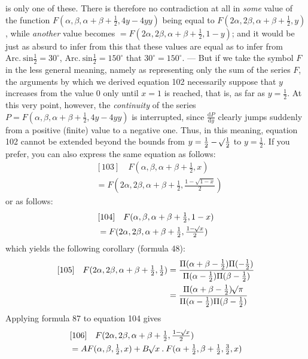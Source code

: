 is only one of these. There is therefore no contradiction at all in \textit{some} value of the function $F(\alpha,\beta,\alpha+\beta+\frac12,4y-4yy)$ being equal to $F(2\alpha,2\beta,\alpha+\beta+\frac12,y)$, while \textit{another} value becomes $=F(2\alpha,2\beta,\alpha+\beta+\frac12,1-y)$; and it would be just as absurd to infer from this that these values are equal as to infer from $\mathrm{Arc.\ sin}\frac12=30^\circ$, $\mathrm{Arc.\ sin}\frac12=150^\circ$ that $30^\circ=150^\circ$. --- But if we take the symbol $F$ in the less general meaning, namely as representing only the sum of the series $F$, the arguments by which we derived equation 102 necessarily suppose that $y$ increases from the value 0 only until $x=1$ is reached, that is, as far as $y=\frac12$. At this very point, however, the \textit{continuity} of the series $P=F(\alpha,\beta,\alpha+\beta+\frac12,4y-4yy)$ is interrupted, since $\frac{\mathrm dP}{\mathrm dy}$ clearly jumps suddenly from a positive (finite) value to a negative one. Thus, in this meaning, equation 102 cannot be extended beyond the bounds from $y=\frac12-\mathord{{}^{}\!\surd}\frac12$ to $y=\frac12$. If you prefer, you can also express the same equation as follows:
\[
\begin{aligned}&[103]\quad F(\alpha,\beta,\alpha+\beta+\tfrac12,x)\\&=F(2\alpha,2\beta,\alpha+\beta+\tfrac12,\tfrac{1-\sqrt{1-x}}2)\end{aligned}
\]
or as follows:
\[
\begin{aligned}&[104]\quad F(\alpha,\beta,\alpha+\beta+\tfrac12,1-x)\\&=F(2\alpha,2\beta,\alpha+\beta+\tfrac12,\tfrac{1-\mathord{{}^{}\!\surd}x}2)\end{aligned}
\]
which yields the following corollary (formula 48):
\[
\begin{aligned}
{}[105]\quad F(2\alpha,2\beta,\alpha+\beta+\tfrac12,\tfrac12)&=\frac{\Pi(\alpha+\beta-\tfrac12)\Pi(-\tfrac12)}{\Pi(\alpha-\tfrac12)\Pi(\beta-\tfrac12)}\\
&=\frac{\Pi(\alpha+\beta-\tfrac12)\mathord{{}^{}\!\surd}\pi}{\Pi(\alpha-\tfrac12)\Pi(\beta-\tfrac12)}
\end{aligned}
\]
Applying formula 87 to equation 104 gives
\[
\begin{aligned}&[106]\quad F(2\alpha,2\beta,\alpha+\beta+\tfrac12,\tfrac{1-\mathord{{}^{}\!\surd}x}2)\\&=AF(\alpha,\beta,\tfrac12,x)+B\mathord{{}^{}\!\surd}x\mathbin{.}F(\alpha+\tfrac12,\beta+\tfrac12,\tfrac32,x)\end{aligned}
\]
